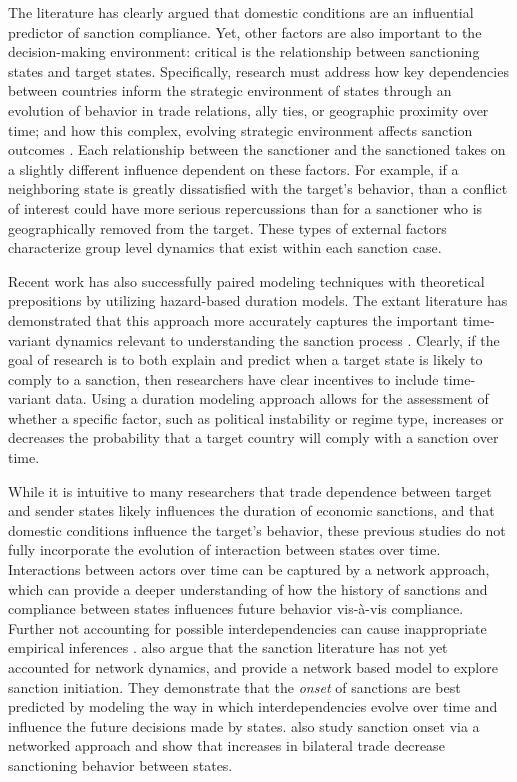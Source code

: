 The literature has clearly argued that domestic conditions are an influential predictor of sanction compliance. Yet, other factors are also important to the decision-making environment: critical is the relationship between sanctioning states and target states. Specifically, research must address how key dependencies between countries inform the strategic environment of states through an evolution of behavior in trade relations, ally ties, or geographic proximity over time; and how this complex, evolving strategic environment affects sanction outcomes \citep{mclean2010friends}. Each relationship between the sanctioner and the sanctioned takes on a slightly different influence dependent on these factors. For example, if a neighboring state is greatly dissatisfied with the target's behavior, than a conflict of interest could have more serious repercussions than for a sanctioner who is geographically removed from the target. These types of external factors characterize group level dynamics that exist within each sanction case. 

Recent work has also successfully paired modeling techniques with theoretical prepositions by utilizing hazard-based duration models. The extant literature has demonstrated that this approach more accurately captures the important time-variant dynamics relevant to understanding the sanction process \citep{bolks2000}. Clearly, if the goal of research is to both explain and predict when a target state is likely to comply to a sanction, then researchers have clear incentives to include time-variant data. Using a duration modeling approach allows for the assessment of whether a specific factor, such as political instability or regime type, increases or decreases the probability that a target country will comply with a sanction over time.

While it is intuitive to many researchers that trade dependence between target and sender states likely influences the duration of economic sanctions, and that domestic conditions influence the target's behavior, these previous studies do not fully incorporate the evolution of interaction between states over time. Interactions between actors over time can be captured by a network approach, which can provide a deeper understanding of how the history of sanctions and compliance between states influences future behavior vis-\`a-vis compliance. Further not accounting for possible interdependencies can cause inappropriate empirical inferences \citep{erikson2014dyadic}. \citet{cranmer2014reciprocity} also argue that the sanction literature has not yet accounted for network dynamics, and provide a network based model to explore sanction initiation. They demonstrate that the \textit{onset} of sanctions are best predicted by modeling the way in which interdependencies evolve over time and influence the future decisions made by states. \citet{hafner2008} also study sanction onset via a networked approach and show that increases in bilateral trade decrease sanctioning behavior between states.

